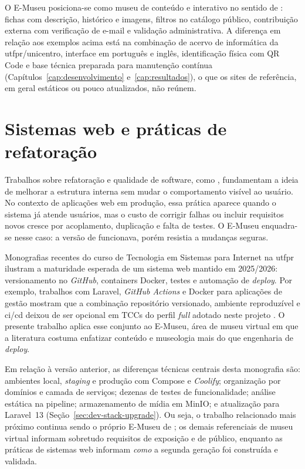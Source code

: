 O E-Museu posiciona-se como museu de conteúdo e interativo no sentido de : fichas com descrição, histórico e imagens, filtros no catálogo público, contribuição externa com verificação de e-mail e validação administrativa. A diferença em relação aos exemplos acima está na combinação de acervo de informática da \acrshort{utfpr}/\acrshort{unicentro}, interface em português e inglês, identificação física com QR Code e base técnica preparada para manutenção contínua (Capítulos~\ref{cap:desenvolvimento} e~\ref{cap:resultados}), o que os sites de referência, em geral estáticos ou pouco atualizados, não reúnem.


\section{Sistemas web e práticas de refatoração}\label{sec:trab-refatoracao}

Trabalhos sobre refatoração e qualidade de software, como , fundamentam a ideia de melhorar a estrutura interna sem mudar o comportamento visível ao usuário. No contexto de aplicações web em produção, essa prática aparece quando o sistema já atende usuários, mas o custo de corrigir falhas ou incluir requisitos novos cresce por acoplamento, duplicação e falta de testes. O E-Museu enquadra-se nesse caso: a versão de  funcionava, porém resistia a mudanças seguras.

Monografias recentes do curso de Tecnologia em Sistemas para Internet na \acrshort{utfpr} ilustram a maturidade esperada de um sistema web mantido em 2025/2026: versionamento no \textit{GitHub}, containers Docker, testes e automação de \textit{deploy}. Por exemplo, trabalhos com Laravel, \textit{GitHub Actions} e Docker para aplicações de gestão mostram que a combinação repositório versionado, ambiente reproduzível e \acrfull{ci/cd} deixou de ser opcional em TCCs do perfil \textit{full} adotado neste projeto \cite{github,githubactions,docker,dockercompose}. O presente trabalho aplica esse conjunto ao E-Museu, área de museu virtual em que a literatura costuma enfatizar conteúdo e museologia mais do que engenharia de \textit{deploy}.

Em relação à versão anterior, as diferenças técnicas centrais desta monografia são: ambientes local, \textit{staging} e produção com Compose e \textit{Coolify}; organização por domínios e camada de serviços; dezenas de testes de funcionalidade; análise estática na pipeline; armazenamento de mídia em MinIO; e atualização para Laravel~13 (Seção~\ref{sec:dev-stack-upgrade}). Ou seja, o trabalho relacionado mais próximo continua sendo o próprio E-Museu de ; os demais referenciais de museu virtual informam sobretudo requisitos de exposição e de público, enquanto as práticas de sistemas web informam \textit{como} a segunda geração foi construída e validada.


